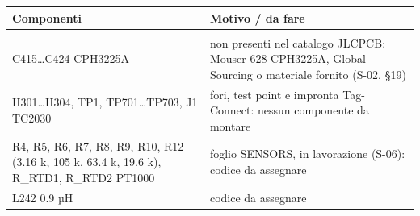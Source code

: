 {\small{}\setlength{\tabcolsep}{4pt}\renewcommand{\arraystretch}{1.1}
\begin{xltabular}{\linewidth}{>{\hsize\raggedright\arraybackslash}X>{\hsize\raggedright\arraybackslash}X}
\toprule
\textbf{Componenti} & \textbf{Motivo /\allowbreak{} da fare} \\
\midrule
\endhead
\midrule[0.15pt]\\\bottomrule\endfoot
\bottomrule\endlastfoot
C415…C424 CPH3225A & non presenti nel catalogo JLCPCB: Mouser 628-CPH3225A, Global Sourcing o materiale fornito (S-02, §19) \\\midrule[0.15pt]
H301…H304, TP1, TP701…TP703, J1 TC2030 & fori, test point e impronta Tag-Connect: nessun componente da montare \\\midrule[0.15pt]
R4, R5, R6, R7, R8, R9, R10, R12 (3.16 k, 105 k, 63.4 k, 19.6 k), R\_\allowbreak{}RTD1, R\_\allowbreak{}RTD2 PT1000 & foglio SENSORS, in lavorazione (S-06): codice da assegnare \\\midrule[0.15pt]
L242 0.9 µH & codice da assegnare \\
\end{xltabular}}
